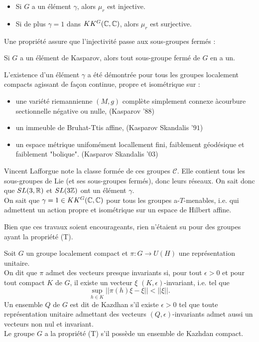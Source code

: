 \begin{Res}[Tu] 
\begin{itemize}
\item Si $G$ a un élément $\gamma$, alors $\mu_r$ est injective.
\item Si de plus $\gamma = 1$ dans $KK^G(\mathbb C,\mathbb C)$, alors $\mu_r$ est surjective.\\
\end{itemize}
\end{Res}

Une propriété assure que l'injectivité passe aux sous-groupes fermés :\\
\begin{prop}
Si $G$ a un élément de Kasparov, alors tout sous-groupe fermé de $G$ en a un.\\
\end{prop}

\begin{Res}
L'existence d'un élément $\gamma$ a été démontrée pour tous les groupes localement compacts agissant de façon continue, propre et isométrique sur :
\begin{itemize}
\item une variété riemannienne $(M,g)$ complète simplement connexe àcourbure sectionnelle négative ou nulle, (Kasparov '$88$)
\item un immeuble de Bruhat-Ttis affine, (Kasparov Skandalis '$91$)
\item un espace métrique unifomément locallement fini, faiblement géodésique et faiblement "bolique". (Kasparov Skandalis '$03$)
\end{itemize}
Vincent Lafforgue note la classe formée de ces groupes $\mathcal C$. Elle contient tous les sous-groupes de Lie (et ses sous-groupes fermés), donc leurs réseaux. On sait donc que $SL(3,\mathbb R)$ et $SL(3\mathbb Z)$ ont un élément $\gamma$.\\

On sait que $\gamma = 1\in KK^G(\mathbb C,\mathbb C)$ pour tous les groupes a-$T$-menables, i.e. qui admettent un action propre et isométrique sur un espace de Hilbert affine. \\
\end{Res}

Bien que ces travaux soient encourageants, rien n'étaient su pour des groupes ayant la propriété (T).\\

\begin{definition}
Soit $G$ un groupe localement compact et $\pi : G\rightarrow U(H)$ une représentation unitaire. \\
On dit que $\pi$ admet des vecteurs presque invariants si, pour tout $\epsilon>0$ et pour tout compact $K$ de $G$, il existe un vecteur $\xi$ $(K,\epsilon)$-invariant, i.e. tel que 
\[\sup_{h\in K}||\pi(h)\xi - \xi||<||\xi||.\]
Un ensemble $Q$ de $G$ est dit de Kazdhan s'il existe $\epsilon>0$ tel que toute représentation unitaire admettant des vecteurs $(Q,\epsilon)$-invariants admet aussi un vecteurs non nul et invariant. \\
Le groupe $G$ a la propriété (T) s'il possède un ensemble de Kazhdan compact.\\
\end{definition}

